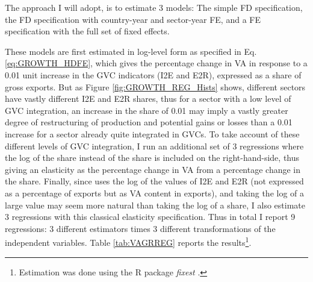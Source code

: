 \documentclass[a4paper]{article}
\begin{document}
The approach I will adopt, is to estimate 3 models: The simple FD specification, the FD specification with country-year and sector-year FE, and a FE specification with the full set of fixed effects. \newline 

These models are first estimated in log-level form as specified in Eq. \ref{eq:GROWTH_HDFE}, which gives the percentage change in VA in response to a 0.01 unit increase in the GVC indicators (I2E and E2R), expressed as a share of gross exports. But as Figure \ref{fig:GROWTH_REG_Hists} shows, different sectors have vastly different I2E and E2R shares, thus for a sector with a low level of GVC integration, an increase in the share of 0.01 may imply a vastly greater degree of restructuring of production and potential gains or losses than a 0.01 increase for a sector already quite integrated in GVCs. To take account of these different levels of GVC integration, I run an additional set of 3 regressions where the log of the share instead of the share is included on the right-hand-side, thus giving an elasticity as the percentage change in VA from a percentage change in the share. Finally, since \citet{Kummritz20161} uses the log of the values of I2E and E2R (not expressed as a percentage of exports but as VA content in exports), and taking the log of a large value may seem more natural than taking the log of a share, I also estimate 3 regressions with this classical elasticity specification. Thus in total I report 9 regressions:  3 different estimators times 3 different transformations of the independent variables. Table \ref{tab:VAGRREG} reports the results\footnote{Estimation was done using the R package \textit{fixest} \citep{fixest2018}.}. \newline %
\end{document}
